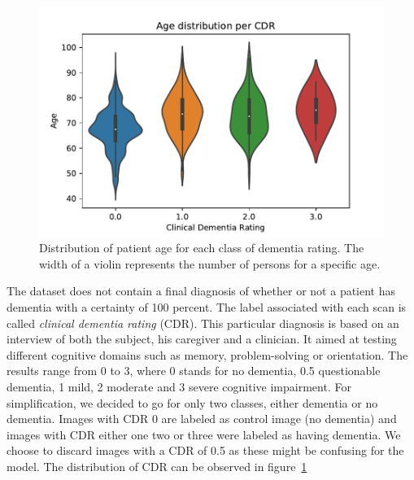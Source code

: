 \begin{figure}
 \centering
 \includegraphics[width=.9\linewidth]{figures/dataset/OASIS_age_dist_per_cdr.pdf}
 \captionsetup{width=.9\linewidth}
 \caption{Distribution of patient age for each class of dementia rating. The width of a violin represents the number of persons for a specific age.}
 \label{fig:OASIS_age_dist}
\end{figure}

The dataset does not contain a final diagnosis of whether or not a patient has dementia with a certainty of 100 percent. The label associated with each scan is called \textit{clinical dementia rating} (CDR)\footnotemark. This particular diagnosis is based on an interview of both the subject, his caregiver and a clinician. It aimed at testing different cognitive domains such as memory, problem-solving or orientation. The results range from 0 to 3, where 0 stands for no dementia, 0.5 questionable dementia, 1 mild, 2 moderate and 3 severe cognitive impairment. For simplification, we decided to go for only two classes, either dementia or no dementia. Images with CDR 0 are labeled as control image (no dementia) and images with CDR either one two or three were labeled as having dementia. We choose to discard images with a CDR of 0.5 as these might be confusing for the model. The distribution of CDR can be observed in figure~\ref{fig:OASIS_age_dist}

